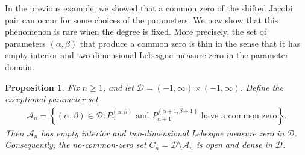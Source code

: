 \documentclass[final,3p,times,12pt]{elsarticle}
\newtheorem{proposition}{Proposition}[section]
\numberwithin{equation}{section}  %
\begin{document}
 In the previous example, we showed that a common zero of the shifted Jacobi pair can occur for some choices of the parameters. We now show that this phenomenon is rare when the degree is fixed. More precisely, the set of parameters $(\alpha,\beta)$ that produce a common zero is thin in the sense that it has empty interior and two-dimensional Lebesgue measure zero in the parameter domain.
	\begin{proposition}\label{Thinparameterset-Jacobicommonzero}
		Fix $n\geq 1$, and let $	\mathcal{D}=(-1,\infty)\times(-1,\infty).$ 	Define the exceptional parameter set
		\begin{align*}
			\mathcal{A}_n	=		\left\{		(\alpha,\beta)\in\mathcal{D}:
			P_n^{(\alpha,\beta)}
			\text{ and }
			P_{n+1}^{(\alpha+1,\beta+1)}
			\text{ have a common zero}
			\right\}.
		\end{align*}
		Then
		$\mathcal{A}_n$ has empty interior and two-dimensional Lebesgue measure zero in $\mathcal{D}$.
		Consequently, the no-common-zero set $	C_n	=	\mathcal{ D}\setminus\mathcal{A}_n$ 	is open and dense in $\mathcal{D}$.
	\end{proposition}
	
\end{document}
